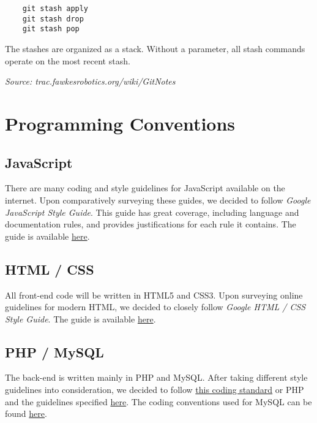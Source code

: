 \documentclass[twoside,12pt,a4paper]{article}
\begin{document}
\begin{lstlisting}
	git stash apply
	git stash drop
	git stash pop
\end{lstlisting}
\vspace*{0.25cm}

The stashes are organized as a stack. Without a parameter, all stash commands operate on the most recent stash.


\begin{flushright} \emph{Source: trac.fawkesrobotics.org/wiki/GitNotes} \end{flushright}

\section{Programming Conventions} %
\label{sec:programming_guidelines}

\subsection{JavaScript} %
\label{sub:javascript}

There are many coding and style guidelines for JavaScript available on the internet. Upon comparatively surveying these guides, we decided to follow \textit{Google JavaScript Style Guide}. This guide has great coverage, including language and documentation rules, and provides justifications for each rule it contains. The guide is available \href{https://google-styleguide.googlecode.com/svn/trunk/javascriptguide.xml}{here}.

\subsection{HTML / CSS} %
\label{sub:htmlcss}

All front-end code will be written in HTML5 and CSS3. Upon surveying online guidelines for modern HTML, we decided to closely follow \textit{Google HTML / CSS Style Guide}. The guide is available \href{https://google-styleguide.googlecode.com/svn/trunk/htmlcssguide.xml}{here}.

\subsection{PHP / MySQL} %
\label{sub:phpmysql}

The back-end is written mainly in PHP and MySQL. After taking different style guidelines into consideration, we decided to follow \href{http://www.php-fig.org/psr/psr-1/}{this coding standard} or PHP and the guidelines specified \href{http://www.php-fig.org/psr/psr-2/}{here}. The coding conventions used for MySQL can be found \href{https://www.drupal.org/node/2497}{here}.
\end{document}

